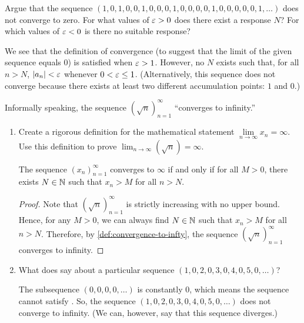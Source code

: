 \begin{problem}
  Argue that the sequence $(1, 0, 1, 0, 0, 1, 0, 0, 0, 1, 0, 0, 0, 0, 1, 0, 0, 0, 0, 0, 1, \ldots)$ 
  does not converge to zero. For what values of $\varepsilon > 0$ does there exist a
  response $N$? For which values of $\varepsilon < 0$ is there no
  suitable response? 

  \vspace{\baselineskip}

    We see that the definition of convergence (to suggest that the limit of the
    given sequence equals $0$) is satisfied when $\varepsilon > 1$. However, no $N$
    exists such that, for all $n > N$, $\left\lvert a_{n} \right\rvert < \varepsilon$ whenever $0 < \varepsilon \leq 1$. 
    (Alternatively, this sequence does not converge because there exists at least
    two different accumulation points: $1$ and $0$.)
\end{problem}

\begin{problem}
  Informally speaking, the sequence $(\sqrt{n})_{n=1}^{\infty}$ ``converges to infinity.''

  \begin{enumerate}[label=(\alph*)]
      \item Create a rigorous definition for the mathematical statement $\lim\limits_{n \to \infty} x_{n} = \infty$. Use this
        definition to prove $\lim_{n \to \infty} (\sqrt{n}) = \infty$.

        \begin{definition}
          \label{def:convergence-to-infty}
          The sequence $(x_{n})_{n=1}^{\infty}$ converges to $\infty$ if and only if
          for all $M > 0$, there exists $N \in \mathbb{N}$ such that $x_{n} > M$ 
          for all $n > N$.
        \end{definition}

        \begin{proof}
          Note that $(\sqrt{n})_{n=1}^{\infty}$ is strictly increasing with no upper bound. 
          Hence, for any $M > 0$, we can always find $N \in \mathbb{N}$ such that $x_{n} > M$ for all $n > N$. 
          Therefore, by \ref{def:convergence-to-infty}, the sequence $(\sqrt{n})_{n=1}^{\infty}$ 
          converges to infinity.
        \end{proof}

      \item What does  say about a particular sequence
        $(1, 0, 2, 0, 3, 0, 4, 0, 5, 0, \ldots)$?

        The subsequence $(0, 0, 0, 0, \ldots)$ is constantly $0$, which means
        the sequence cannot satisfy . So,
        the sequence $(1, 0, 2, 0, 3, 0, 4, 0, 5, 0, \ldots)$ does not converge 
        to infinity. (We can, however, say that this sequence diverges.)

  \end{enumerate}
\end{problem}

